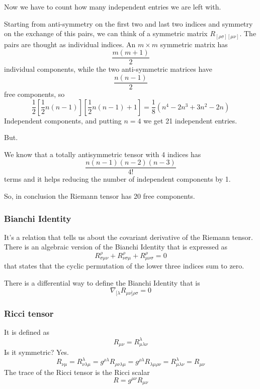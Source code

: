 Now we have to count how many independent entries we are left with.\par
Starting from anti-symmetry on the first two and last two indices and symmetry on the exchange of this pairs, we can think of a symmetric matrix $R_{[\rho \sigma ][\mu \nu ]}$. The pairs are thought as individual indices. An $m\times m$ symmetric matrix has 
\[
\frac{m\left( m+1 \right)}{2}
\]
individual components, while the two anti-symmetric matrices have
\[
\frac{n\left( n-1 \right)}{2}
\]
free components, so
\[
	\frac{1}{2} \left[ \frac{1}{2} n\left( n-1 \right)\right] \left[ \frac{1}{2} n \left( n-1 \right)+1\right] = \frac{1}{8} \left( n^{4} -2n^{3} +3n^{2} -2n \right)
\]
Independent components, and putting $n=4$ we get 21 independent entries. \par
But.\par
We know that a totally antisymmetric tensor with 4 indices has
\[
\frac{n\left( n-1 \right)\left( n-2 \right)\left( n-3 \right)}{4!}
\]
terms and it helps reducing the number of independent components by 1.\par
So, in conclusion the Riemann tensor has 20 free components.\par
\subsubsection{Bianchi Identity}
It's a relation that tells us about the covariant derivative of the Riemann tensor.
There is an algebraic version of the Bianchi Identity that is expressed as
\begin{equation}
R^{\rho }_{\sigma \mu \nu } + R^{\rho }_{\nu \sigma \mu } + R^{\rho }_{\mu \nu \sigma } = 0
\end{equation}
that states that the cyclic permutation of the lower three indices sum to zero.\par
There is a differential way to define the Bianchi Identity that is
\begin{equation}
	\nabla_{[\lambda }R_{\mu \nu ]\rho \sigma } = 0		
\end{equation}

\subsubsection{Ricci tensor}
It is defined as
\begin{equation}
R_{\mu \nu } = R^{\lambda }_{\mu \lambda \nu }
\end{equation}
Is it symmetric? Yes.
\[
R_{\nu \mu } = R^{\lambda }_{ \nu \lambda \mu } = g^{\rho \lambda }R_{\rho \nu \lambda \mu } = g^{\rho \lambda }R_{\lambda \mu \rho \nu } = R^{\lambda }_{\mu \lambda \nu } = R_{\mu \nu }
\]
The trace of the Ricci tensor is the Ricci scalar
\begin{equation}
R = g^{\mu \nu }R_{\mu \nu }
\end{equation}

